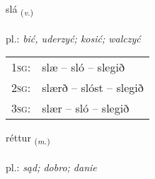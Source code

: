 \documentclass[frontgrid, backgrid]{flacards}\usepackage[]{graphicx}\usepackage[]{xcolor}
\begin{document}
\renewcommand{\flhead}{\vskip5pt \fboxsep=0pt {\small\bfseries\footnotesize Sagnorð | Verb}}
\renewcommand{\fcfoot}{\vskip5pt \fboxsep=0pt \hspace{2pt}{\small\bfseries\footnotesize 1K}}

\renewcommand{\blhead}{\vskip5pt {\small\bfseries\footnotesize Sagnorð | Verb }}
\renewcommand{\bcfoot}{\vskip5pt \hspace{2pt}{\small\bfseries\footnotesize 1K}}


{slá \small{\textsubscript{(\textit{v.})}} \\[1ex] %
\textphonetic{[stlauː]} \\
pl.: \emph{bić, uderzyć; kosić; walczyć} \\  [2ex]
\renewcommand*{\arraystretch}{0.8}
\begin{tabular}{p{1cm}l}
\textsc{1sg}: & slæ -- sló -- slegið \\ 
\textsc{2sg}: & slærð -- slóst -- slegið \\ 
\textsc{3sg}: & slær -- sló -- slegið \\ 
\end{tabular}
}

\renewcommand{\flhead}{\vskip5pt \fboxsep=0pt {\small\bfseries\footnotesize Nafnorð | Noun}}
\renewcommand{\fcfoot}{\vskip5pt \fboxsep=0pt \hspace{2pt}{\small\bfseries\footnotesize 1K}}

\renewcommand{\blhead}{\vskip5pt {\small\bfseries\footnotesize Nafnorð | Noun }}
\renewcommand{\bcfoot}{\vskip5pt \hspace{2pt}{\small\bfseries\footnotesize 1K}}


{réttur \small{\textsubscript{(\textit{m.})}} \\[1ex] %
\textphonetic{[rjɛhtʏr]} \\
pl.: \emph{sąd; dobro; danie} \\  [2ex]
\renewcommand*{\arraystretch}{0.8}
}
\end{document}

